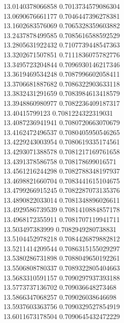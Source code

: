 {13.0140378066858 0.7013734579086304 \\
13.0690676661177 0.7046447396278381 \\
13.1602683576069 0.7065328359603882 \\
13.2437878499585 0.7085616588592529 \\
13.2805631922432 0.7107739448547363 \\
13.3202671507851 0.7111836075782776 \\
13.3495723204844 0.7096930146217346 \\
13.3619469534248 0.7087996602058411 \\
13.3706681887682 0.7086322903633118 \\
13.3832431291659 0.7083984613418579 \\
13.3948860980977 0.7082236409187317 \\
13.40415799123 0.7081224322319031 \\
13.4087236941941 0.7080720663070679 \\
13.4162472496537 0.7080405950546265 \\
13.4229243003954 0.7080619335174561 \\
13.4293071388578 0.7081217169761658 \\
13.4391378586758 0.708178699016571 \\
13.4561216244298 0.7082788348197937 \\
13.4698821660704 0.7083441615104675 \\
13.4799266915245 0.7082287073135376 \\
13.4890822033014 0.7081348896026611 \\
13.4929586739539 0.7081410884857178 \\
13.4968172355911 0.7081707119941711 \\
13.503497383999 0.7082949280738831 \\
13.5104452978218 0.7084426879882812 \\
13.5211414209544 0.7086315155029297 \\
13.5380286731898 0.7088049650192261 \\
13.5506808780337 0.7089322805404663 \\
13.5683310591157 0.7090297937393188 \\
13.5773737136702 0.709036648273468 \\
13.5866347068257 0.709026038646698 \\
13.5937603363756 0.7090329527854919 \\
13.6011673178504 0.7090645432472229 \\
}
